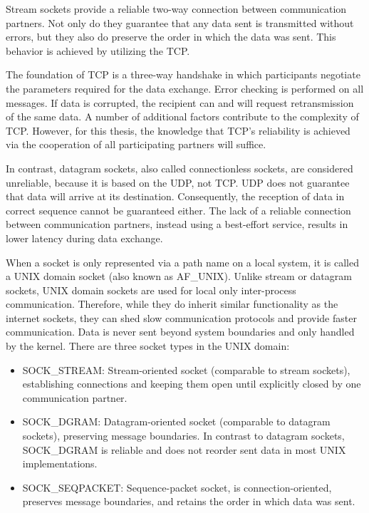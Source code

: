 Stream sockets provide a reliable two-way connection between communication partners.
Not only do they guarantee that any data sent is transmitted without errors, but they also do preserve the order in which the data was sent.
This behavior is achieved by utilizing the \ac{TCP}.\cite{beej:sockets}

The foundation of \ac{TCP} is a three-way handshake in which participants negotiate the parameters required for the data exchange.
Error checking is performed on all messages.
If data is corrupted, the recipient can and will request retransmission of the same data.
A number of additional factors contribute to the complexity of \ac{TCP}.
However, for this thesis, the knowledge that \ac{TCP}'s reliability is achieved via the cooperation of all participating partners will suffice.

In contrast, datagram sockets, also called connectionless sockets, are considered unreliable, because it is based on the \ac{UDP}, not \ac{TCP}.
\ac{UDP} does not guarantee that data will arrive at its destination.
Consequently, the reception of data in correct sequence cannot be guaranteed either.
The lack of a reliable connection between communication partners, instead using a best-effort service, results in lower latency during data exchange.\cite{beej:sockets}

When a socket is only represented via a path name on a local system, it is called a UNIX domain socket (also known as AF\_UNIX).
Unlike stream or datagram sockets, UNIX domain sockets are used for local only inter-process communication.
Therefore, while they do inherit similar functionality as the internet sockets, they can shed slow communication protocols and provide faster communication.
Data is never sent beyond system boundaries and only handled by the kernel.
There are three socket types in the UNIX domain\cite{man:unixsockets}:
\begin{itemize}
    \itemsep0em
    \item SOCK\_STREAM\@: Stream-oriented socket (comparable to stream sockets), establishing connections and keeping them open until explicitly closed by one communication partner.
    \item SOCK\_DGRAM\@: Datagram-oriented socket (comparable to datagram sockets), preserving message boundaries. In contrast to datagram sockets, SOCK\_DGRAM is reliable and does not reorder sent data in most UNIX implementations.
    \item SOCK\_SEQPACKET\@: Sequence-packet socket, is connection-oriented, preserves message boundaries, and retains the order in which data was sent.
\end{itemize}

